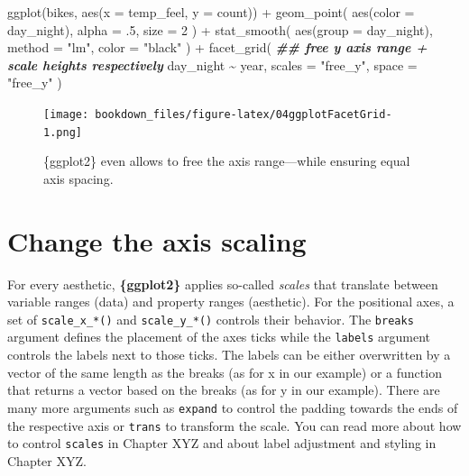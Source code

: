 \documentclass[
]{krantz}
\makeatletter
\newenvironment{Shaded}{\begin{snugshade}}{\end{snugshade}}
\newcommand{\AttributeTok}[1]{\textcolor[rgb]{0.61,0.61,0.61}{#1}}
\newcommand{\DecValTok}[1]{\textcolor[rgb]{0.06,0.06,0.06}{#1}}
\newcommand{\DocumentationTok}[1]{\textcolor[rgb]{0.37,0.37,0.37}{\textbf{\textit{#1}}}}
\newcommand{\FunctionTok}[1]{\textcolor[rgb]{0,0,0}{#1}}
\newcommand{\NormalTok}[1]{#1}
\newcommand{\SpecialCharTok}[1]{\textcolor[rgb]{0,0,0}{#1}}
\newcommand{\StringTok}[1]{\textcolor[rgb]{0.5,0.5,0.5}{#1}}
\newenvironment{kframe}{%
\medskip{}
\setlength{\fboxsep}{.8em}
 \def\at@end@of@kframe{}%
 \ifinner\ifhmode%
  \def\at@end@of@kframe{\end{minipage}}%
  \begin{minipage}{\columnwidth}%
 \fi\fi%
 \def\FrameCommand##1{\hskip\@totalleftmargin \hskip-\fboxsep
 \colorbox{shadecolor}{##1}\hskip-\fboxsep
     \hskip-\linewidth \hskip-\@totalleftmargin \hskip\columnwidth}%
 \MakeFramed {\advance\hsize-\width
   \@totalleftmargin\z@ \linewidth\hsize
   \@setminipage}}%
 {\par\unskip\endMakeFramed%
 \at@end@of@kframe}
\renewenvironment{Shaded}{\begin{kframe}}{\end{kframe}}
\makeatother
\begin{document}
\begin{Shaded}
\begin{Highlighting}[]
\FunctionTok{ggplot}\NormalTok{(bikes, }\FunctionTok{aes}\NormalTok{(}\AttributeTok{x =}\NormalTok{ temp\_feel, }\AttributeTok{y =}\NormalTok{ count)) }\SpecialCharTok{+} 
  \FunctionTok{geom\_point}\NormalTok{(}
    \FunctionTok{aes}\NormalTok{(}\AttributeTok{color =}\NormalTok{ day\_night), }\AttributeTok{alpha =}\NormalTok{ .}\DecValTok{5}\NormalTok{, }\AttributeTok{size =} \DecValTok{2}
\NormalTok{  ) }\SpecialCharTok{+} 
  \FunctionTok{stat\_smooth}\NormalTok{(}
    \FunctionTok{aes}\NormalTok{(}\AttributeTok{group =}\NormalTok{ day\_night), }\AttributeTok{method =} \StringTok{"lm"}\NormalTok{, }\AttributeTok{color =} \StringTok{"black"}
\NormalTok{  ) }\SpecialCharTok{+}
  \FunctionTok{facet\_grid}\NormalTok{(}
    \DocumentationTok{\#\# free y axis range + scale heights respectively}
\NormalTok{    day\_night }\SpecialCharTok{\textasciitilde{}}\NormalTok{ year, }\AttributeTok{scales =} \StringTok{"free\_y"}\NormalTok{, }\AttributeTok{space =} \StringTok{"free\_y"}
\NormalTok{  )}
\end{Highlighting}
\end{Shaded}

\begin{figure}
\centering
\texttt{[image: bookdown\_files/figure-latex/04ggplotFacetGrid-1.png]}
\caption{\label{fig:04ggplotFacetGrid}\{ggplot2\} even allows to free the axis range---while ensuring equal axis spacing.}
\end{figure}

\hypertarget{axis-scaling}{%
\section{Change the axis scaling}\label{axis-scaling}}

For every aesthetic, \textbf{\{ggplot2\}} applies so-called \emph{scales} that translate between variable ranges (data) and property ranges (aesthetic). For the positional axes, a set of \texttt{scale\_x\_*()} and \texttt{scale\_y\_*()} controls their behavior. The \texttt{breaks} argument defines the placement of the axes ticks while the \texttt{labels} argument controls the labels next to those ticks. The labels can be either overwritten by a vector of the same length as the breaks (as for x in our example) or a function that returns a vector based on the breaks (as for y in our example). There are many more arguments such as \texttt{expand} to control the padding towards the ends of the respective axis or \texttt{trans} to transform the scale. You can read more about how to control \texttt{scales} in Chapter XYZ and about label adjustment and styling in Chapter XYZ.
\end{document}
